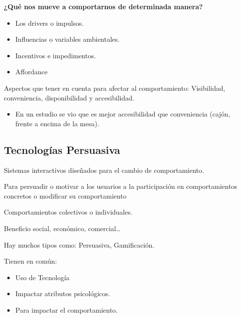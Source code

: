 \documentclass[12pt, twoside, openright]{report} %
\begin{document}
\textbf{¿Qué nos mueve a comportarnos de determinada manera?}
\begin{itemize}
  \item Los drivers o impulsos.
  \item Influencias o variables ambientales.
  \item Incentivos e impedimentos.
  \item Affordance
\end{itemize}

Aspectos que tener en cuenta para afectar al comportamiento: Visibilidad, conveniencia, disponibilidad y accesibilidad.
\begin{itemize}
  \item En un estudio se vio que es mejor accesibilidad que conveniencia (cajón, frente a encima de la mesa).
\end{itemize}  


\subsection{Tecnologías Persuasiva}
Sistemas interactivos diseñados para el cambio de comportamiento.

Para persuadir o motivar a los usuarios a la participación en comportamientos concretos o modificar su comportamiento 

Comportamientos colectivos o individuales.

Beneficio social, económico, comercial\dots

Hay muchos tipos como: Persuasiva, Gamificación.

Tienen en común:
\begin{itemize}
  \item Uso de Tecnología
  \item Impactar atributos psicológicos.
  \item Para impactar el comportamiento.
\end{itemize}
\end{document}
